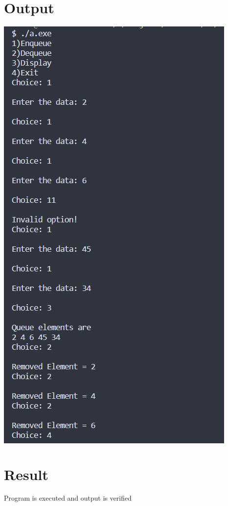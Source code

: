 \section{Output}
\includegraphics[]{Cycle_1/Outputs/CircularQueue.png}
\section{Result}
Program is executed and output is verified